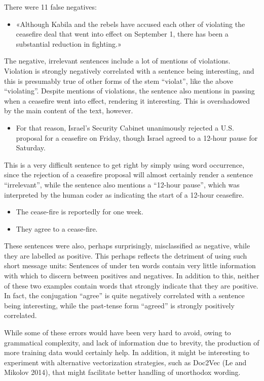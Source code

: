 \documentclass[12pt,twoside]{reedthesis}
\providecommand{\tightlist}{%
  \setlength{\itemsep}{0pt}\setlength{\parskip}{0pt}}
\begin{document}
There were 11 false negatives:
\begin{itemize}
\tightlist
\item
  «Although Kabila and the rebels have accused each other of violating
  the ceasefire deal that went into effect on September 1, there has
  been a substantial reduction in fighting.»
\end{itemize}
The negative, irrelevant sentences include a lot of mentions of
violations. Violation is strongly negatively correlated with a sentence
being interesting, and this is presumably true of other forms of the
stem ``violat'', like the above ``violating''. Despite mentions of
violations, the sentence also mentions in passing when a ceasefire went
into effect, rendering it interesting. This is overshadowed by the main
content of the text, however.
\begin{itemize}
\tightlist
\item
  For that reason, Israel's Security Cabinet unanimously rejected a U.S.
  proposal for a ceasefire on Friday, though Israel agreed to a 12-hour
  pause for Saturday.
\end{itemize}
This is a very difficult sentence to get right by simply using word
occurrence, since the rejection of a ceasefire proposal will almost
certainly render a sentence ``irrelevant'', while the sentence also
mentions a ``12-hour pause'', which was interpreted by the human coder
as indicating the start of a 12-hour ceasefire.
\begin{itemize}
\tightlist
\item
  The cease-fire is reportedly for one week.
\item
  They agree to a cease-fire.
\end{itemize}
These sentences were also, perhaps surprisingly, misclassified as
negative, while they are labelled as positive. This perhaps reflects the
detriment of using such short message units: Sentences of under ten
words contain very little information with which to discern between
positives and negatives. In addition to this, neither of these two
examples contain words that strongly indicate that they are positive. In
fact, the conjugation ``agree'' is quite negatively correlated with a
sentence being interesting, while the past-tense form ``agreed'' is
strongly positively correlated.

While some of these errors would have been very hard to avoid, owing to
grammatical complexity, and lack of information due to brevity, the
production of more training data would certainly help. In addition, it
might be interesting to experiment with alternative vectorization
strategies, such as Doc2Vec (Le and Mikolov 2014), that might facilitate
better handling of unorthodox wording.
\end{document}
